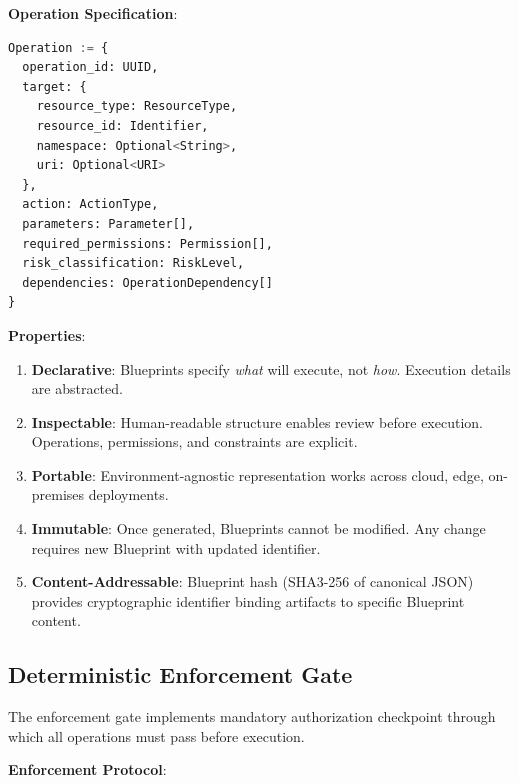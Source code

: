 \documentclass[11pt,letterpaper]{article}
\begin{document}
\textbf{Operation Specification}:

\begin{lstlisting}[language=Python,caption=Operation Structure]
Operation := {
  operation_id: UUID,
  target: {
    resource_type: ResourceType,
    resource_id: Identifier,
    namespace: Optional<String>,
    uri: Optional<URI>
  },
  action: ActionType,
  parameters: Parameter[],
  required_permissions: Permission[],
  risk_classification: RiskLevel,
  dependencies: OperationDependency[]
}
\end{lstlisting}

\textbf{Properties}:

\begin{enumerate}
\item \textbf{Declarative}: Blueprints specify \emph{what} will execute, not \emph{how}. Execution details are abstracted.

\item \textbf{Inspectable}: Human-readable structure enables review before execution. Operations, permissions, and constraints are explicit.

\item \textbf{Portable}: Environment-agnostic representation works across cloud, edge, on-premises deployments.

\item \textbf{Immutable}: Once generated, Blueprints cannot be modified. Any change requires new Blueprint with updated identifier.

\item \textbf{Content-Addressable}: Blueprint hash (SHA3-256 of canonical JSON) provides cryptographic identifier binding artifacts to specific Blueprint content.
\end{enumerate}

\subsection{Deterministic Enforcement Gate}

The enforcement gate implements mandatory authorization checkpoint through which all operations must pass before execution.

\textbf{Enforcement Protocol}:
\end{document}
